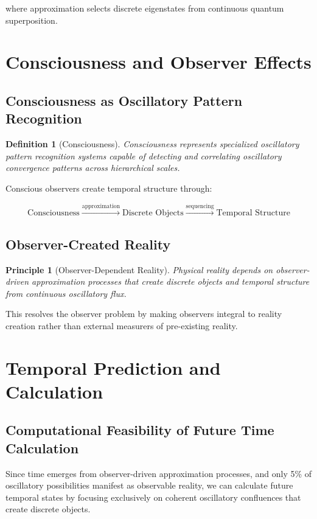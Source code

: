 \documentclass[11pt]{article}
\newtheorem{definition}[theorem]{Definition}
\newtheorem{principle}[theorem]{Principle}
\theoremstyle{remark}
\begin{document}
where approximation selects discrete eigenstates from continuous quantum superposition.

\section{Consciousness and Observer Effects}

\subsection{Consciousness as Oscillatory Pattern Recognition}

\begin{definition}[Consciousness]
Consciousness represents specialized oscillatory pattern recognition systems capable of detecting and correlating oscillatory convergence patterns across hierarchical scales.
\end{definition}

Conscious observers create temporal structure through:

$$\text{Consciousness} \xrightarrow{\text{approximation}} \text{Discrete Objects} \xrightarrow{\text{sequencing}} \text{Temporal Structure}$$

\subsection{Observer-Created Reality}

\begin{principle}[Observer-Dependent Reality]
Physical reality depends on observer-driven approximation processes that create discrete objects and temporal structure from continuous oscillatory flux.
\end{principle}

This resolves the observer problem by making observers integral to reality creation rather than external measurers of pre-existing reality.

\section{Temporal Prediction and Calculation}

\subsection{Computational Feasibility of Future Time Calculation}

Since time emerges from observer-driven approximation processes, and only 5\% of oscillatory possibilities manifest as observable reality, we can calculate future temporal states by focusing exclusively on coherent oscillatory confluences that create discrete objects.
\end{document}
